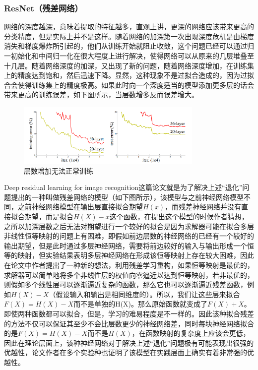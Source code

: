 \documentclass[10pt,a4paper,twoside]{article}
\numberwithin{figure}{section}%
\numberwithin{table}{section}%
\begin{document}
\subsubsection{ResNet（残差网络）}
网络的深度越深，意味着提取的特征越多，直观上讲，更深的网络应该带来更高的分类精度，但是实际上并不是这样。随着网络的加深第一次出现深度危机是由梯度消失和梯度爆炸所引起的，他们从训练开始就阻止收敛，这个问题已经可以通过归一初始化和中间归一化在很大程度上进行解决，使得网络可以从原来的几层堆叠至十几层。随着网络深度的加深，又出现了新的问题，随着网络深度增加，在训练集上的精度达到饱和，然后迅速下降。显然，这种现象不是过拟合造成的，因为过拟合会使得训练集上的精度极高。如果此时向一个深度适当的模型添加更多层的话会带来更高的训练误差，如下图所示，当层数增多反而误差增大。
	\begin{figure}[H]
	    \centering
	    \includegraphics[width=0.8\textwidth]{figures/图片1.png}
	    \caption{层数增加无法正常训练}
	    \label{fig:1}
	\end{figure}
Deep residual learning for image recognition这篇论文就是为了解决上述“退化”问题提出的一种叫做残差网络的模型（如下图所示），该模型与之前神经网络模型不同，之前神经网络模型在输出层直接拟合期望$H(x)$，而残差神经网络并没有直接拟合期望，而是拟合$H(X) - x$这个函数，在提出这个模型的时候作者猜想，之所以加深层数之后无法对期望进行一个较好的拟合是因为求解器可能在拟合多层非线性恒等映射的问题上有困难，即假如前边层数的神经网络的已经有一个较好的输出期望，但是此时通过多层神经网络，需要将前边较好的输入与输出形成一个恒等的映射，但实验结果表明多层神经网络在形成该恒等映射上存在较大困难，因此在论文中作者提出了一种新的想法，利用残差学习重构，如果恒等映射是最优的，求解器可以简单地将多个非线性层的权值向零逼近以达到恒等映射，若非最优的，则假如多个线性层可以逐渐逼近复杂的函数，那么它也可以逐渐逼近残差函数，例如$H(X) - X$（假设输入和输出是相同维度的）。所以，我们让这些层来拟合$F(X) = H(X) - X$而不是单独的H(X)。那么原始函数就变成了$F(X) + X$。即使两种函数都可以拟合，但是，学习的难易程度是不一样的。因此该种拟合残差的方法不仅可以保证其至少不会比层数更少的神经网络差，同时每块神经网络拟合的是$F(X) = H(X) - X$而不是$H(X)$，在函数映射的复杂度上应该会更低，因此在理论层面上，该种神经网络对于解决上述“退化”问题极有可能表现出很强的优越性，论文作者在多个实验种也证明了该模型在实践层面上确实有着非常强的优越性。
\end{document}
